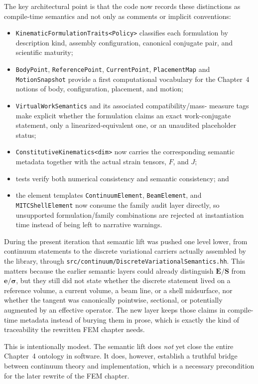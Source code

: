 The key architectural point is that the code now records these distinctions as
compile-time semantics and not only as comments or implicit conventions:
\begin{itemize}
  \item \texttt{KinematicFormulationTraits<Policy>} classifies each formulation
  by description kind, assembly configuration, canonical conjugate pair, and
  scientific maturity;
  \item \texttt{BodyPoint}, \texttt{ReferencePoint}, \texttt{CurrentPoint},
  \texttt{PlacementMap} and \texttt{MotionSnapshot} provide a first
  computational vocabulary for the Chapter~4 notions of body, configuration,
  placement, and motion;
  \item \texttt{VirtualWorkSemantics} and its associated compatibility/mass-
  measure tags make explicit whether the formulation claims an exact
  work-conjugate statement, only a linearized-equivalent one, or an unaudited
  placeholder status;
  \item \texttt{ConstitutiveKinematics<dim>} now carries the corresponding
  semantic metadata together with the actual strain tensors, \(F\), and \(J\);
  \item tests verify both numerical consistency and semantic consistency; and
  \item the element templates \texttt{ContinuumElement},
  \texttt{BeamElement}, and \texttt{MITCShellElement} now consume the family
  audit layer directly, so unsupported formulation/family combinations are
  rejected at instantiation time instead of being left to narrative warnings.
\end{itemize}

During the present iteration that semantic lift was pushed one level lower,
from continuum statements to the discrete variational carriers actually
assembled by the library, through
\texttt{src/continuum/DiscreteVariationalSemantics.hh}.  This matters because
the earlier semantic layers could already distinguish \( \mathbf{E}/\mathbf{S}
\) from \( \mathbf{e}/\boldsymbol{\sigma} \), but they still did not state
whether the discrete statement lived on a reference volume, a current volume,
a beam line, or a shell midsurface, nor whether the tangent was canonically
pointwise, sectional, or potentially augmented by an effective operator.  The
new layer keeps those claims in compile-time metadata instead of burying them
in prose, which is exactly the kind of traceability the rewritten FEM chapter
needs.

This is intentionally modest.  The semantic lift does \emph{not} yet close the
entire Chapter~4 ontology in software.  It does, however, establish a truthful
bridge between continuum theory and implementation, which is a necessary
precondition for the later rewrite of the FEM chapter.

